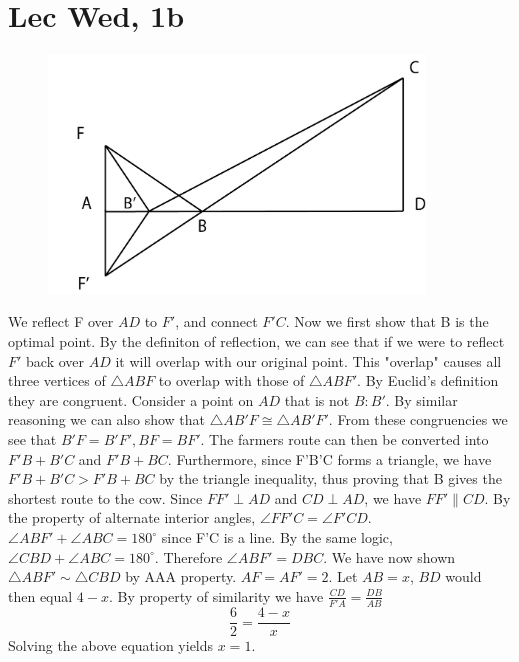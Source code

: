 \documentclass[12pt]{article}
\newcommand{\degrees}{^{\circ}}
\begin{document}
\section{Lec Wed, 1b}
\begin{figure}[h]
    \includegraphics[width = 100mm]{GRAPH2.png}
\end{figure}
We reflect F over $AD$ to $F'$, and connect $F'C$. Now we first show that B is the optimal point.
\newline
By the definiton of reflection, we can see that if we were to reflect $F'$ back over $AD$ it will overlap with our original point. This "overlap" causes all three vertices of $\triangle ABF$ to overlap with those of $\triangle ABF'$. By Euclid's definition they are congruent.
\newline
Consider a point on $AD$ that is not $B: B'$. By similar reasoning we can also show that $\triangle AB'F \cong \triangle AB'F'$.
\newline
From these congruencies we see that $B'F = B'F', BF = BF'$. The farmers route can then be converted into $F'B+B'C$ and $F'B + BC$. Furthermore, since F'B'C forms a triangle, we have $F'B+B'C > F'B + BC$ by the triangle inequality, thus proving that B gives the shortest route to the cow.
\newline
Since $FF' \perp AD$ and $CD \perp AD$, we have $FF' \parallel CD$. By the property of alternate interior angles, $\angle FF'C = \angle F'CD$.
\newline
$\angle ABF' + \angle ABC = 180 \degrees$ since F'C is a line. By the same logic, $\angle CBD + \angle ABC  = 180 \degrees$. Therefore $\angle ABF' = DBC$. We have now shown $\triangle ABF' \sim \triangle CBD$ by AAA property.
\newline
$AF = AF' = 2$. Let $AB = x$, $BD$ would then equal $4-x$. By property of similarity we have $\frac{CD}{F'A} = \frac{DB}{AB}$
$$\frac{6}{2} = \frac{4-x}{x}$$
Solving the above equation yields $x=1$.
\newpage
\end{document}
